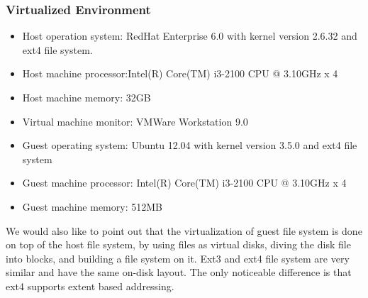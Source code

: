 \subsubsection{Virtualized Environment}
\begin{itemize}
\item{}
Host operation system: RedHat Enterprise 6.0 with kernel version 2.6.32 and ext4 file system. 
\item{}
Host machine processor:Intel(R) Core(TM) i3-2100 CPU @ 3.10GHz x 4
\item{}
Host machine memory: 32GB
\item{}
Virtual machine monitor: VMWare Workstation 9.0
\item{}
Guest operating system: Ubuntu 12.04 with kernel version 3.5.0 and ext4 file system
\item{}
Guest machine processor: Intel(R) Core(TM) i3-2100 CPU @ 3.10GHz x 4
\item{}
Guest machine memory: 512MB
\end{itemize}

We would also like to point out that the virtualization of guest file system is done on top of the host file system, by using files as virtual disks, diving the disk file into blocks, and building a file system on it. Ext3 and ext4 file system are very similar and have the same on-disk layout.  The only noticeable difference is that ext4 supports extent based addressing.

